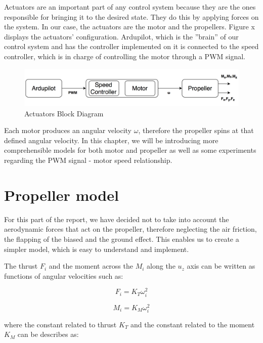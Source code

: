 Actuators are an important part of any control system because they are the ones responsible for bringing it to the desired state. They do this by applying forces on the system. In our case, the actuators are the motor and the propellers. Figure x displays the actuators' configuration. Ardupilot, which is the ''brain'' of our control system and has the controller implemented on it is connected to the speed controller, which is in charge of controlling the motor through a PWM signal. 

\begin{figure}[H]
  \centering
    \includegraphics[width=1\textwidth]{images/ablockd.png}
	\caption{Actuators Block Diagram}
	\label{ablockd}
\end{figure}

Each motor produces an angular velocity $\omega$, therefore the propeller spins at that defined angular velocity. In this chapter, we will be introducing more comprehensible models for both motor and propeller as well as some experiments regarding the PWM signal - motor speed relationship.

\section{Propeller model}
For this part of the report, we have decided not to take into account the aerodynamic forces that act on the propeller, therefore neglecting the air friction, the flapping of the biased and the ground effect. This enables us to create a simpler model, which is easy to understand and implement.

The thrust $F_{i}$ and the moment across the $M_{i}$ along the $u_{z}$ axis can be written as functions of angular velocities such as:

\begin{equation}
	F_{i}=K_{T}\omega_{i}^{2}
\end{equation}

\begin{equation}
	M_{i}=K_{M}\omega_{i}^{2}
\end{equation}

where the constant related to thrust $K_{T}$ and the constant related to the moment $K_{M}$ can be describes as:

